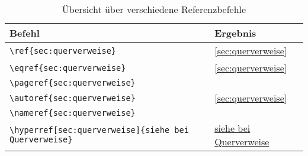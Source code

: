 \begin{table}[H]
    \centering
    \begin{tabular}{ll}
        \toprule
        \textbf{Befehl}                                                              & \textbf{Ergebnis}                                   \\
        \midrule
        \texttt{\textbackslash ref\{sec:querverweise\}}                              & \ref{sec:querverweise}                              \\
        \texttt{\textbackslash eqref\{sec:querverweise\}}                            & \eqref{sec:querverweise}                            \\
        \texttt{\textbackslash pageref\{sec:querverweise\}}                          & \pageref{sec:querverweise}                          \\
        \texttt{\textbackslash autoref\{sec:querverweise\}}                          & \autoref{sec:querverweise}                          \\
        \texttt{\textbackslash nameref\{sec:querverweise\}}                          & \nameref{sec:querverweise}                          \\
        \texttt{\textbackslash hyperref[sec:querverweise]\{siehe bei Querverweise\}} & \hyperref[sec:querverweise]{siehe bei Querverweise} \\
        \bottomrule
    \end{tabular}
    \caption{Übersicht über verschiedene Referenzbefehle}
    \label{tab:querverweise}
\end{table}